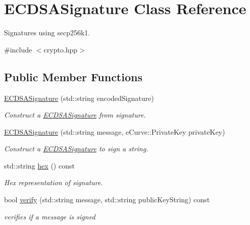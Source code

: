 \hypertarget{classECDSASignature}{}\section{E\+C\+D\+S\+A\+Signature Class Reference}
\label{classECDSASignature}


Signatures using secp256k1.  




{\ttfamily \#include $<$crypto.\+hpp$>$}

\subsection*{Public Member Functions}
\begin{DoxyCompactItemize}
\item 
\mbox{\hyperlink{classECDSASignature_a9b02f26402e6e70ef8fa80f799652c27}{E\+C\+D\+S\+A\+Signature}} (std\+::string encoded\+Signature)
\begin{DoxyCompactList}\small\item\em Construct a \mbox{\hyperlink{classECDSASignature}{E\+C\+D\+S\+A\+Signature}} from signature. \end{DoxyCompactList}\item 
\mbox{\hyperlink{classECDSASignature_a459b85f89b2d2706cac10c8f28298e9b}{E\+C\+D\+S\+A\+Signature}} (std\+::string message, e\+Curve\+::\+Private\+Key private\+Key)
\begin{DoxyCompactList}\small\item\em Construct a \mbox{\hyperlink{classECDSASignature}{E\+C\+D\+S\+A\+Signature}} to sign a string. \end{DoxyCompactList}\item 
std\+::string \mbox{\hyperlink{classECDSASignature_a9179c6cec311dbb746ffe876dce12844}{hex}} () const
\begin{DoxyCompactList}\small\item\em Hex representation of signature. \end{DoxyCompactList}\item 
bool \mbox{\hyperlink{classECDSASignature_aae4f75f7c0b41adddee0123392d8d960}{verify}} (std\+::string message, std\+::string public\+Key\+String) const
\begin{DoxyCompactList}\small\item\em verifies if a message is signed \end{DoxyCompactList}\end{DoxyCompactItemize}
